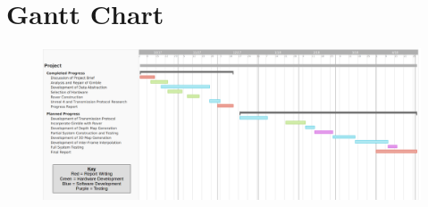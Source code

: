 \chapter{Gantt Chart}
\begin{landscape}
\begin{figure}[ht]
    \begin{center}
    \includegraphics[width=1.5\textwidth]{Figures/ganttfinal.png}
    \label{fig:GanttChart}
    \end{center}
\end{figure}
\end{landscape}